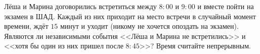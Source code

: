 \documentclass{article}
\begin{document}
Лёша и Марина договорились встретиться между $8{:}00$ и $9{:}00$ и вместе пойти на экзамен в ШАД. Каждый из них приходит 
на место встречи в случайный момент времени, ждёт $15$ минут и уходит (никому не хочется опоздать на экзамен). Являются ли 
независимыми события <<Лёша и Марина не встретились>> и <<хотя бы один из них пришел после $8{:}45$>>? Время считайте непрерывным.
\end{document}
